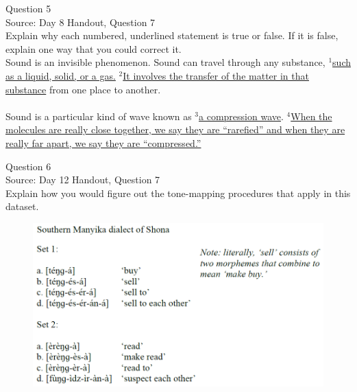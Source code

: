 \documentclass[12pt]{article}
\begin{document}
\newpage

{\large Question 5}\\

Source: Day 8 Handout, Question 7\\

Explain why each numbered, underlined statement is true or false. If it is false, explain one way that you could correct it.\\

Sound is an invisible phenomenon. Sound can travel through any substance, $^1$\ul{such as a liquid, solid, or a gas.} $^2$\ul{It involves the transfer of the matter in that substance} from one place to another.\\\\Sound is a particular kind of wave known as $^3$\ul{a compression wave}. $^4$\ul{When the molecules are really close together, we say they are ``rarefied'' and when they are really far apart, we say they are ``compressed.''}


\newpage

{\large Question 6}\\

Source: Day 12 Handout, Question 7\\

Explain how you would figure out the tone-mapping procedures that apply in this dataset.\\

\begin{figure}[H]
\includegraphics{../images/shona.png}
\end{figure}

\newpage

\begin{center}
\textbf{{\color{red}{\HUGE END OF EXAM}}}\\

\end{center}
\newpage
\end{document}
